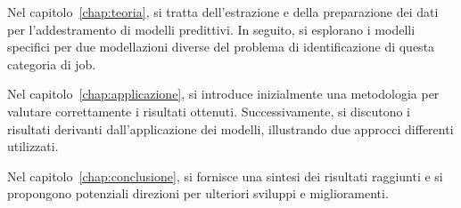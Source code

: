 \mbox{}

Nel capitolo~\ref{chap:teoria}, si tratta dell'estrazione e della preparazione
dei dati per l'addestramento di modelli predittivi. In seguito, si esplorano i
modelli specifici per due modellazioni diverse del problema di identificazione
di questa categoria di job.

\mbox{}

Nel capitolo~\ref{chap:applicazione}, si introduce inizialmente una
metodologia per valutare correttamente i risultati ottenuti. Successivamente,
si discutono i risultati derivanti dall'applicazione dei modelli, illustrando
due approcci differenti utilizzati.

\mbox{}

Nel capitolo~\ref{chap:conclusione}, si fornisce una sintesi dei risultati
raggiunti e si propongono potenziali direzioni per ulteriori sviluppi e
miglioramenti. 
